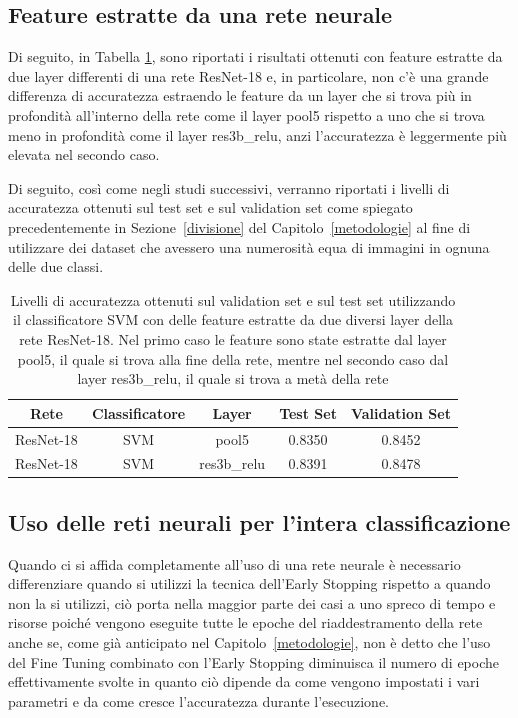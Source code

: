 \subsection{Feature estratte da una rete neurale}

Di seguito, in Tabella \ref{tabella_estrazione}, sono riportati i risultati ottenuti con feature estratte da due layer differenti di una rete ResNet-18 e, in particolare, non c'è una grande differenza di accuratezza estraendo le feature da un layer che si trova più in profondità all'interno della rete come il layer pool5 rispetto a uno che si trova meno in profondità come il layer res3b\_relu, anzi l'accuratezza è leggermente più elevata nel secondo caso.

Di seguito, così come negli studi successivi, verranno riportati i livelli di accuratezza ottenuti sul test set e sul validation set come spiegato precedentemente in Sezione~\ref{divisione} del Capitolo~\ref{metodologie} al fine di utilizzare dei dataset che avessero una numerosità equa di immagini in ognuna delle due classi.

\begin{table}[H]
\centering
\begin{tabular}{| c | c | c | c | c |}
\hline
Rete & Classificatore & Layer & Test Set & Validation Set\\ [0.5ex]
\hline
ResNet-18 & SVM & pool5 & 0.8350 & 0.8452 \\
ResNet-18 & SVM & res3b\_relu & 0.8391 & 0.8478 \\
\hline
\end{tabular}
\caption{Livelli di accuratezza ottenuti sul validation set e sul test set utilizzando il classificatore SVM con delle feature estratte da due diversi layer della rete ResNet-18. Nel primo caso le feature sono state estratte dal layer pool5, il quale si trova alla fine della rete, mentre nel secondo caso dal layer res3b\_relu, il quale si trova a metà della rete}
\label{tabella_estrazione}
\end{table}

\subsection{Uso delle reti neurali per l'intera classificazione}

Quando ci si affida completamente all'uso di una rete neurale è necessario differenziare quando si utilizzi la tecnica dell'Early Stopping rispetto a quando non la si utilizzi, ciò porta nella maggior parte dei casi a uno spreco di tempo e risorse poiché vengono eseguite tutte le epoche del riaddestramento della rete anche se, come già anticipato nel Capitolo~\ref{metodologie}, non è detto che l'uso del Fine Tuning combinato con l'Early Stopping diminuisca il numero di epoche effettivamente svolte in quanto ciò dipende da come vengono impostati i vari parametri e da come cresce l'accuratezza durante l'esecuzione.


